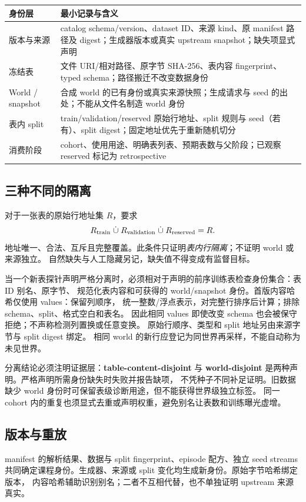 \documentclass[10pt,UTF8,fontset=fandol]{ctexart}
\begin{document}
\begin{center}\small
\begin{tabularx}{\linewidth}{@{}p{34mm}Y@{}}\toprule
身份层 & 最小记录与含义 \\\midrule
版本与来源 & catalog schema/version、dataset ID、来源 kind、原 manifest 路径及 digest；生成器版本或真实 upstream snapshot；缺失项显式声明 \\
冻结表 & 文件 URI/相对路径、原字节 SHA-256、表内容 fingerprint、typed schema；路径搬迁不改变数据身份 \\
World / snapshot & 合成 world 的已有身份或真实来源快照；生成请求与 seed 的出处；不能从文件名制造 world 身份 \\
表内 split & train/validation/reserved 原始行地址、split 规则与 seed（若有）、split digest；固定地址优先于重新随机切分 \\
消费阶段 & cohort、使用用途、明确表列表、预期表数与父阶段；已观察 reserved 标记为 retrospective \\\bottomrule
\end{tabularx}
\end{center}

\subsection{三种不同的隔离}
对于一张表的原始行地址集 $R$，要求
\[
R_{\rm train}\;\dot\cup\;R_{\rm validation}\;\dot\cup\;R_{\rm reserved}=R.
\]
地址唯一、合法、互斥且完整覆盖。此条件只证明\emph{表内行隔离}；不证明 world 或来源独立。
自然缺失与人工隐藏另记，缺失值不得变成有监督目标。

当一个新表探针声明严格分离时，必须相对于声明的前序训练表检查身份集合：表 ID 别名、原字节、
规范化表内容和可获得的 world/snapshot 身份。首版内容哈希仅使用 values：保留列顺序，
统一整数/浮点表示，对完整行排序后计算；排除 schema、split、格式空白和表名。
因此相同 values 即使改变 schema 也会被保守拒绝；不声称检测列置换或任意变换。
原始行顺序、类型和 split 地址另由来源字节与 split digest 绑定。
相同 world 的新行应登记为同世界再采样，不能自动称为未见世界。

分离结论必须注明证据层：\textbf{table-content-disjoint} 与
\textbf{world-disjoint} 是两种声明。严格声明所需身份缺失时失败并报告缺项，
不凭种子不同补足证明。旧数据缺少 world 身份时可保留表级诊断用途，但不能获得世界级独立标签。
同一 cohort 内的重复也须显式去重或声明权重，避免别名让表数和训练曝光虚增。

\subsection{版本与重放}
manifest 的解析结果、数据与 split fingerprint、episode 配方、独立 seed streams
共同确定课程身份。生成器、来源或 split 变化均生成新身份。原始字节哈希绑定版本，
内容哈希辅助识别别名；二者不互相代替，也不单独证明 upstream 来源真实。
\end{document}
